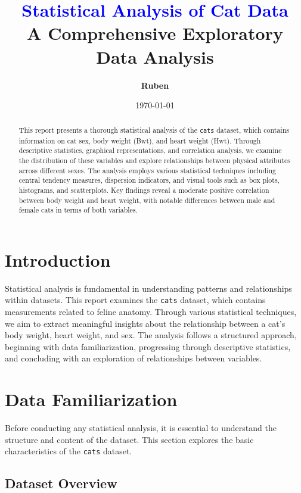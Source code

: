 \documentclass[a4paper,12pt]{article}
\title{\textcolor{blue}{\Huge Statistical Analysis of Cat Data}\\[0.5cm]
       \Large A Comprehensive Exploratory Data Analysis}
\author{\textbf{Ruben}}
\date{\today}
\begin{document}
\maketitle
\thispagestyle{empty}

\begin{abstract}
\noindent
This report presents a thorough statistical analysis of the \texttt{cats} dataset, which contains information on cat sex, body weight (Bwt), and heart weight (Hwt). Through descriptive statistics, graphical representations, and correlation analysis, we examine the distribution of these variables and explore relationships between physical attributes across different sexes. The analysis employs various statistical techniques including central tendency measures, dispersion indicators, and visual tools such as box plots, histograms, and scatterplots. Key findings reveal a moderate positive correlation between body weight and heart weight, with notable differences between male and female cats in terms of both variables.
\end{abstract}

\tableofcontents
\thispagestyle{empty}
\newpage

\section{Introduction}
\label{sec:intro}

Statistical analysis is fundamental in understanding patterns and relationships within datasets. This report examines the \texttt{cats} dataset, which contains measurements related to feline anatomy. Through various statistical techniques, we aim to extract meaningful insights about the relationship between a cat's body weight, heart weight, and sex. The analysis follows a structured approach, beginning with data familiarization, progressing through descriptive statistics, and concluding with an exploration of relationships between variables.

\section{Data Familiarization}
\label{sec:familiarization}

Before conducting any statistical analysis, it is essential to understand the structure and content of the dataset. This section explores the basic characteristics of the \texttt{cats} dataset.

\subsection{Dataset Overview}
\label{subsec:overview}
\end{document}

